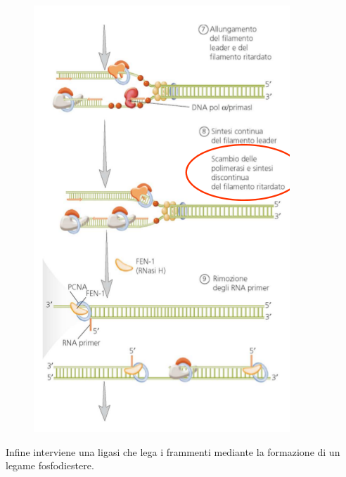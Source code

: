 \documentclass[11pt]{book}
\begin{document}
\begin{figure}[htp]
\centering
\includegraphics[scale=0.5]{img/18_FEN1.png}
\caption{}
\label{fen1}
\end{figure}

\clearpage
Infine interviene una ligasi che lega i frammenti mediante la formazione
di un legame fosfodiestere.
\end{document}
